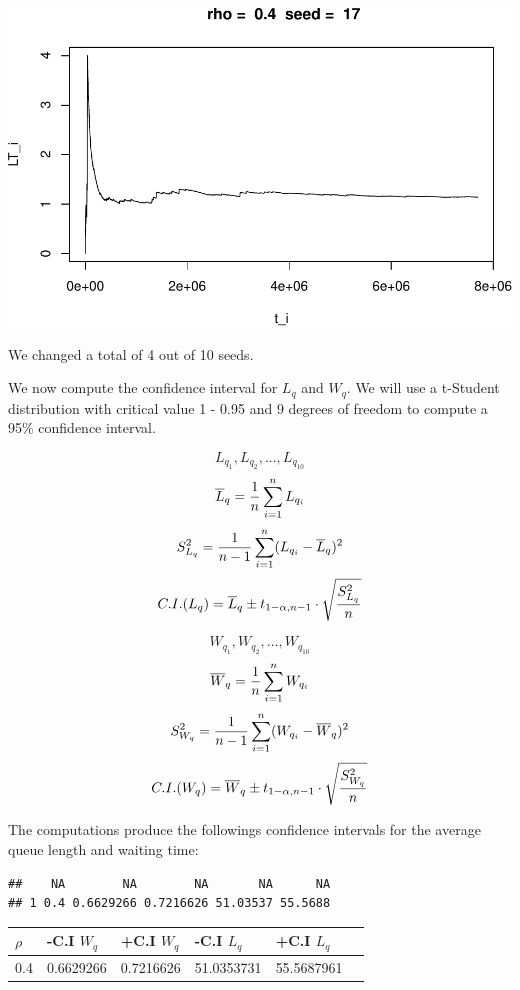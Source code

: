 \documentclass[]{article}
\begin{document}
\includegraphics{003_files/figure-latex/unnamed-chunk-15-10.pdf}

We changed a total of 4 out of 10 seeds.

We now compute the confidence interval for \(L_{q}\) and \(W_{q}\). We
will use a t-Student distribution with critical value 1 - 0.95 and 9
degrees of freedom to compute a 95\% confidence interval.

\[
L_{q_{1}},L_{q_{2}},...,L_{q_{10}} \]
\[ \overline{L}_{q} = {1 \over n}\sum_{i=1}^{n}L_{q_{i}} \]
\[ S_{L_{q}}^{2} = {1 \over n - 1} \sum_{i=1}^{n} ( L_{q_{i}} - \overline{L}_{q} )^{2} \]
\[ C.I.(L_{q}) =   \overline{L}_{q} \pm t_{1 - \alpha, n - 1} \cdot \sqrt{S_{L_{q}}^{2} \over n} \]

\[
W_{q_{1}},W_{q_{2}},...,W_{q_{10}} \]
\[ \overline{W}_{q} = {1 \over n}\sum_{i=1}^{n}W_{q_{i}} \]
\[ S_{W_{q}}^{2} = {1 \over n - 1} \sum_{i=1}^{n} ( W_{q_{i}} - \overline{W}_{q} )^{2} \]
\[ C.I.(W_{q}) =   \overline{W}_{q} \pm t_{1 - \alpha, n - 1} \cdot \sqrt{S_{W_{q}}^{2} \over n} \]

The computations produce the followings confidence intervals for the
average queue length and waiting time:

\begin{verbatim}
##    NA        NA        NA       NA      NA
## 1 0.4 0.6629266 0.7216626 51.03537 55.5688
\end{verbatim}

\begin{longtable}[]{@{}llllll@{}}
\toprule
\(\rho\) & -C.I \(W_{q}\) & +C.I \(W_{q}\) & -C.I \(L_{q}\) & +C.I
\(L_{q}\) &\tabularnewline
\midrule
\endhead
0.4 & 0.6629266 & 0.7216626 & 51.0353731 & 55.5687961\tabularnewline
\bottomrule
\end{longtable}
\end{document}
